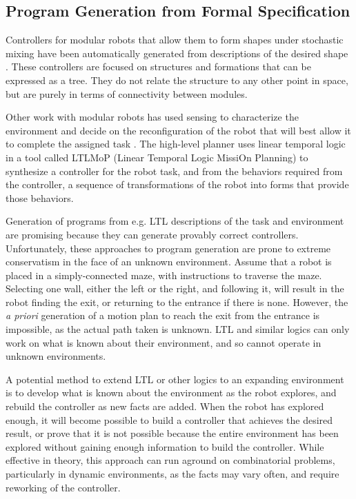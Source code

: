 \subsection{Program Generation from Formal Specification} \label{section:Program_Generation}

Controllers for modular robots that allow them to form shapes under stochastic mixing have been automatically generated from descriptions of the desired shape \citep{klavins2002automatic}. 
These controllers are focused on structures and formations that can be expressed as a tree. 
They do not relate the structure to any other point in space, but are purely in terms of connectivity between modules. 

Other work with modular robots has used sensing to characterize the environment and decide on the reconfiguration of the robot that will best allow it to complete the assigned task \citep{daudelin2017integrated, jing2016end}.
The high-level planner uses linear temporal logic in a tool called LTLMoP (Linear Temporal Logic MissiOn Planning) to synthesize a controller for the robot task, and from the behaviors required from the controller, a sequence of transformations of the robot into forms that provide those behaviors. 
	
Generation of programs from e.g. LTL descriptions of the task and environment are promising because they can generate provably correct controllers.
Unfortunately, these approaches to program generation are prone to extreme conservatism in the face of an unknown environment. 
Assume that a robot is placed in a simply-connected maze, with instructions to traverse the maze. 
Selecting one wall, either the left or the right, and following it, will result in the robot finding the exit, or returning to the entrance if there is none. 
However, the \emph{a priori} generation of a motion plan to reach the exit from the entrance is impossible, as the actual path taken is unknown. 
LTL and similar logics can only work on what is known about their environment, and so cannot operate in unknown environments. 
	
A potential method to extend LTL or other logics to an expanding environment is to develop what is known about the environment as the robot explores, and rebuild the controller as new facts are added. 
When the robot has explored enough, it will become possible to build a controller that achieves the desired result, or prove that it is not possible because the entire environment has been explored without gaining enough information to build the controller. 
While effective in theory, this approach can run aground on combinatorial problems, particularly in dynamic environments, as the facts may vary often, and require reworking of the controller. 

